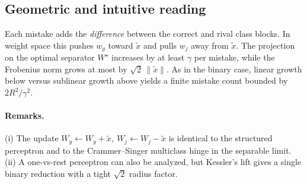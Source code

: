 \documentclass[11pt]{article}
\begin{document}
\subsection{Geometric and intuitive reading}
Each mistake adds the \emph{difference} between the correct and rival class blocks. In weight space this pushes $w_y$ toward $\tilde x$ and pulls $w_j$ away from $\tilde x$. The projection on the optimal separator $W^\star$ increases by at least $\gamma$ per mistake, while the Frobenius norm grows at most by $\sqrt{2}\,\|\tilde x\|$. As in the binary case, linear growth below versus sublinear growth above yields a finite mistake count bounded by $2R^2/\gamma^2$.

\paragraph{Remarks.} 
(i) The update $W_y\!\leftarrow\!W_y+\tilde x,\ W_j\!\leftarrow\!W_j-\tilde x$ is identical to the structured perceptron and to the Crammer--Singer multiclass hinge in the separable limit. 
(ii) A one-vs-rest perceptron can also be analyzed, but Kessler’s lift gives a single binary reduction with a tight $\sqrt{2}$ radius factor.
\end{document}

